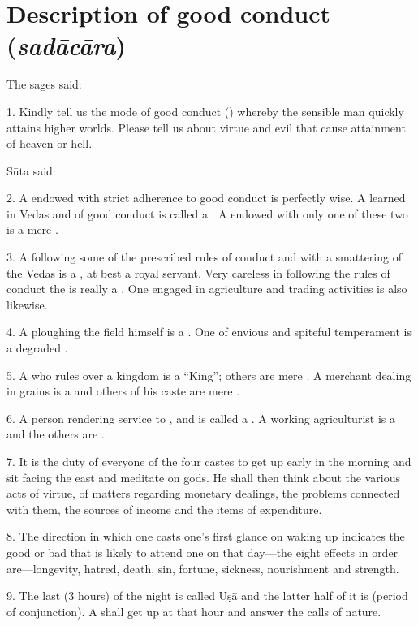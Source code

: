 \chapter{Description of good conduct (\emph{sadācāra})}

The sages said:

1. Kindly tell us the mode of good conduct () whereby the sensible
man quickly attains higher worlds. Please tell us about virtue and evil that
cause attainment of heaven or hell.

Sūta said:

2. A  endowed with strict adherence to good conduct is perfectly
wise. A  learned in Vedas and of good conduct is called
a . A  endowed with only one of these two is a mere
.

3. A  following some of the prescribed rules of conduct and with
a smattering of the Vedas is a , at best a royal servant.
Very careless in following the rules of conduct the  is really
a . One engaged in agriculture and trading activities is
also likewise.

4. A  ploughing the field himself is a . One of
envious and spiteful temperament is a degraded .

5. A  who rules over a kingdom is a “King”; others are mere
. A merchant dealing in grains \etc is a  and others of
his caste are mere .

6. A person rendering service to ,  and 
is called a . A working agriculturist is a  and the others
are .

7. It is the duty of everyone of the four castes to get up early in the morning
and sit facing the east and meditate on gods. He shall then think about
the various acts of virtue, of matters regarding monetary dealings, the problems
connected with them, the sources of income and the items of expenditure.

8. The direction in which one casts one’s first glance on waking up indicates
the good or bad that is likely to attend one on that day—the eight effects in
order are—longevity, hatred, death, sin, fortune, sickness, nourishment and
strength.

9. The last  (3 hours) of the night is called Uṣā and the latter half
of it is  (period of conjunction). A  shall get up at
that hour and answer the calls of nature.


